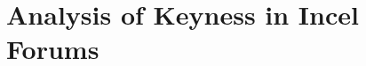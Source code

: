\documentclass[11pt]{article}
\begin{document}










\appendix

\section{Analysis of Keyness in Incel Forums}
\label{app:keyness}
\end{document}
